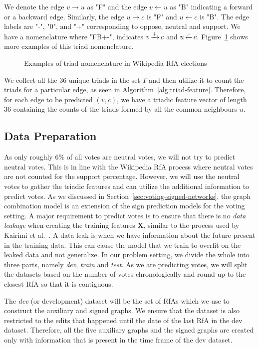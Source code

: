 We denote the edge $v \rightarrow u$ as "F" and the edge $v \leftarrow u$ as "B" indicating a forward or a backward edge.
Similarly, the edge $u \rightarrow c$ is "F" and $u \leftarrow c$ is "B".
The edge labels are "-", "0", and "+" corresponding to oppose, neutral and support.
We have a nomenclature where "FB+-", indicates $v\operatorname*{\xrightarrow{+}} c$ and $u \operatorname*{\xleftarrow{-}} c$.
Figure~\ref{fig:triad-naming} shows more examples of this triad nomenclature.

\begin{figure}[htp]
    \centering
    
    \caption{Examples of triad nomenclature in Wikipedia RfA elections }
    \label{fig:triad-naming}
\end{figure}
We collect all the 36 unique triads in the set $T$ and then utilize it to count the triads for a particular edge, as seen in Algorithm~\ref{alg:triad-feature}.
Therefore, for each edge to be predicted $(v,c)$, we have a triadic feature vector of length 36 containing the counts of the triads formed by all the common neighbours $u$.  

\subsection{Data Preparation}
\label{subsec:data-prep}
As only roughly $6\%$ of all votes are neutral votes, we will not try to predict neutral votes.
This is in line with the Wikipedia RfA process where neutral votes are not counted for the support percentage. 
However, we will use the neutral votes to gather the triadic features and can utilize the additional information to predict votes.
As we discussed in Section~\ref{sec:voting-signed-networks}, the graph combination model is an extension of the sign prediction models for the voting setting.
A major requirement to predict votes is to ensure that there is no \textit{data leakage} when creating the training features $\mathbf{X}$, similar to the process used by Kairimi et al.\ \cite{karimi2019multicongress}.
A data leak is when we have information about the future present in the training data.
This can cause the model that we train to overfit on the leaked data and not generalize.
In our problem setting, we divide the whole \wikirfa into three parts, namely \textit{dev}, \textit{train} and \textit{test}.
As we are predicting votes, we will split the datasets based on the number of votes chronologically and round up to the closest RfA so that it is contiguous. 

The \textit{dev} (or development) dataset will be the set of RfAs which we use to construct the auxiliary and signed graphs.
We ensure that the \usercontrib dataset is also restricted to the edits that happened until the date of the last RfA in the dev dataset.
Therefore, all the five auxiliary graphs and the signed graphs are created only with information that is present in the time frame of the dev dataset.


